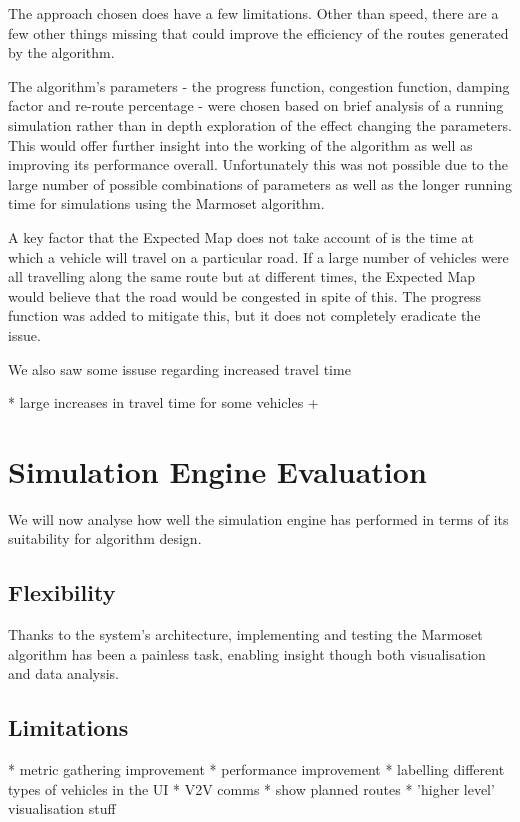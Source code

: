 \documentclass[ %
                    author={Alexander Hill},
                supervisor={Dr. Benjamin Sach},
                    degree={MEng},
                     title={MARMOSET},
                  subtitle={Multi-Agent Route Management using Online Simulation for Efficient Transportation},
                      type={research},
                      year={2016} ]{dissertation}
\begin{document}
The approach chosen does have a few limitations. Other than speed, there are a
few other things missing that could improve the efficiency of the routes
generated by the algorithm.

The algorithm's parameters - the progress function, congestion function, damping
factor and re-route percentage - were chosen based on brief analysis of a
running simulation rather than in depth exploration of the effect changing the
parameters. This would offer further insight into the working of the algorithm
as well as improving its performance overall. Unfortunately this was not
possible due to the large number of possible combinations of parameters as well
as the longer running time for simulations using the Marmoset algorithm.

A key factor that the Expected Map does not take account of is the time at which
a vehicle will travel on a particular road. If a large number of vehicles were
all travelling along the same route but at different times, the Expected Map
would believe that the road would be congested in spite of this. The progress
function was added to mitigate this, but it does not completely eradicate the
issue.

We also saw some issuse regarding increased travel time

* large increases in travel time for some vehicles +

\section{Simulation Engine Evaluation}

We will now analyse how well the simulation engine has performed in terms
of its suitability for algorithm design.

\subsection{Flexibility}

Thanks to the system's architecture, implementing and testing the Marmoset
algorithm has been a painless task, enabling insight though both visualisation
and data analysis.

\subsection{Limitations}

* metric gathering improvement
* performance improvement
* labelling different types of vehicles in the UI
* V2V comms
* show planned routes
* 'higher level' visualisation stuff
\end{document}
